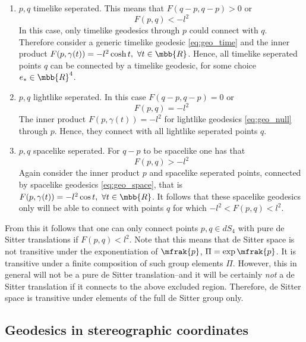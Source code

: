 \documentclass[11pt]{article}
\begin{document}
\begin{enumerate}
	\item $p,q$ timelike seperated. This means that $F(q-p,q-p) > 
		0$ or
		\begin{equation}
			F(p,q) < -l^2
		\end{equation}
		In this case, only timelike geodesics through $p$ could 
		connect with $q$. Therefore consider a generic timelike 
		geodesic \eqref{eq:geo_time} and the inner product 
		$F(p,\gamma(t)) = -l^2 \cosh t,~\forall t \in \mbb{R}$.  
		Hence, all timelike seperated points $q$ can be connected by 
		a	timelike geodesic, for some choice $e_\ast \in \mbb{R}^4$.
	\item $p,q$ lightlike seperated. In this case $F(q-p,q-p) = 0$ 
		or
		\begin{equation}
			F(p,q) = -l^2
		\end{equation}
		The inner product $F(p,\gamma(t)) = -l^2$ for lightlike 
		geodesics \eqref{eq:geo_null} through $p$. Hence, they 
		connect with all lightlike seperated points $q$.
	\item $p,q$ spacelike seperated. For $q-p$ to be spacelike one 
		has that
		\begin{equation}
			F(p,q) > -l^2
		\end{equation}
		Again consider the inner product $p$ and spacelike seperated 
		points, connected by spacelike geodesics 
		\eqref{eq:geo_space}, that is $F(p,\gamma(t)) = -l^2 \cos 
		t,~\forall t \in \mbb{R}$. It follows that these spacelike 
		geodesics only will be able to connect with points $q$ for 
		which $-l^2 < F(p,q) < l^2$.
\end{enumerate}
From this it follows that one can only connect points $p,q \in 
dS_4$ with pure de Sitter translations if $F(p,q) < l^2$. Note 
that this means that de Sitter space is not transitive under the 
exponentiation of $\mfrak{p}$, $\Pi = \exp \mfrak{p}$. It is 
transitive under a finite composition of such group elements 
$\Pi$.  However, this in general will not be a pure de Sitter 
translation--and it will be certainly \emph{not} a de Sitter 
translation if it connects to the above excluded region.  
Therefore, de Sitter space is transitive under elements of the 
full de Sitter group only.

\subsection{Geodesics in stereographic coordinates}
\end{document}
